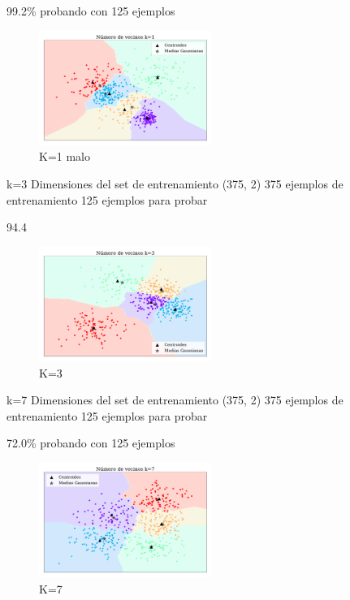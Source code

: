 99.2\% probando con 125 ejemplos

\begin{figure}[H]
    \centering
    \includegraphics[width=0.5\textwidth]{ejer_4_K-1_si_converge.pdf}
    \caption{K=1 malo}
    \label{fig:ejer4_k_1}
\end{figure} 


k=3
Dimensiones del set de entrenamiento  (375, 2)
375 ejemplos de entrenamiento
125 ejemplos para probar

94.4%

\begin{figure}[H]
    \centering
    \includegraphics[width=0.5\textwidth]{ejer_4_K-3_si_converge.pdf}
    \caption{K=3 }
    \label{fig:ejer4_k_3}
\end{figure} 

k=7
Dimensiones del set de entrenamiento  (375, 2)
375 ejemplos de entrenamiento
125 ejemplos para probar

72.0\% probando con 125 ejemplos
\begin{figure}[H]
    \centering
    \includegraphics[width=0.5\textwidth]{ejer_4_K-7_si_converge.pdf}
    \caption{K=7 }
    \label{fig:ejer4_k_7}
\end{figure} 



